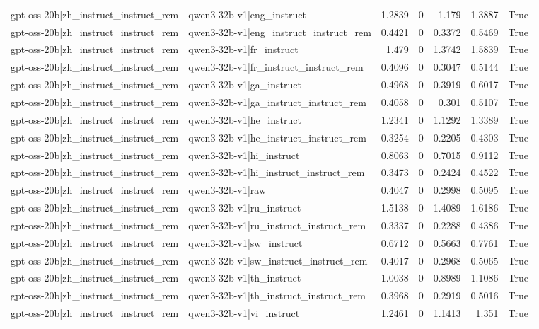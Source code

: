 \begin{table}
\begin{tabular}{l l r r r r l}
gpt-oss-20b|zh_instruct_instruct_rem & qwen3-32b-v1|eng_instruct & 1.2839 & 0 & 1.179 & 1.3887 & True \\
gpt-oss-20b|zh_instruct_instruct_rem & qwen3-32b-v1|eng_instruct_instruct_rem & 0.4421 & 0 & 0.3372 & 0.5469 & True \\
gpt-oss-20b|zh_instruct_instruct_rem & qwen3-32b-v1|fr_instruct & 1.479 & 0 & 1.3742 & 1.5839 & True \\
gpt-oss-20b|zh_instruct_instruct_rem & qwen3-32b-v1|fr_instruct_instruct_rem & 0.4096 & 0 & 0.3047 & 0.5144 & True \\
gpt-oss-20b|zh_instruct_instruct_rem & qwen3-32b-v1|ga_instruct & 0.4968 & 0 & 0.3919 & 0.6017 & True \\
gpt-oss-20b|zh_instruct_instruct_rem & qwen3-32b-v1|ga_instruct_instruct_rem & 0.4058 & 0 & 0.301 & 0.5107 & True \\
gpt-oss-20b|zh_instruct_instruct_rem & qwen3-32b-v1|he_instruct & 1.2341 & 0 & 1.1292 & 1.3389 & True \\
gpt-oss-20b|zh_instruct_instruct_rem & qwen3-32b-v1|he_instruct_instruct_rem & 0.3254 & 0 & 0.2205 & 0.4303 & True \\
gpt-oss-20b|zh_instruct_instruct_rem & qwen3-32b-v1|hi_instruct & 0.8063 & 0 & 0.7015 & 0.9112 & True \\
gpt-oss-20b|zh_instruct_instruct_rem & qwen3-32b-v1|hi_instruct_instruct_rem & 0.3473 & 0 & 0.2424 & 0.4522 & True \\
gpt-oss-20b|zh_instruct_instruct_rem & qwen3-32b-v1|raw & 0.4047 & 0 & 0.2998 & 0.5095 & True \\
gpt-oss-20b|zh_instruct_instruct_rem & qwen3-32b-v1|ru_instruct & 1.5138 & 0 & 1.4089 & 1.6186 & True \\
gpt-oss-20b|zh_instruct_instruct_rem & qwen3-32b-v1|ru_instruct_instruct_rem & 0.3337 & 0 & 0.2288 & 0.4386 & True \\
gpt-oss-20b|zh_instruct_instruct_rem & qwen3-32b-v1|sw_instruct & 0.6712 & 0 & 0.5663 & 0.7761 & True \\
gpt-oss-20b|zh_instruct_instruct_rem & qwen3-32b-v1|sw_instruct_instruct_rem & 0.4017 & 0 & 0.2968 & 0.5065 & True \\
gpt-oss-20b|zh_instruct_instruct_rem & qwen3-32b-v1|th_instruct & 1.0038 & 0 & 0.8989 & 1.1086 & True \\
gpt-oss-20b|zh_instruct_instruct_rem & qwen3-32b-v1|th_instruct_instruct_rem & 0.3968 & 0 & 0.2919 & 0.5016 & True \\
gpt-oss-20b|zh_instruct_instruct_rem & qwen3-32b-v1|vi_instruct & 1.2461 & 0 & 1.1413 & 1.351 & True \\

\end{tabular}
\end{table}
